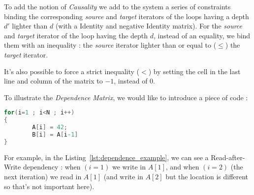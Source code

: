 \documentclass[paper=a4, fontsize=11.5pt]{scrartcl}
\numberwithin{equation}{section}        %
\numberwithin{figure}{section}          %
\numberwithin{table}{section}               %
\begin{document}
\begin{itemize}
                To add the notion of \textit{Causality} we add to the system a series of
                constraints binding the corresponding \textit{source} and \textit{target}
                iterators of the loops having a depth $d'$ lighter than $d$
                (with a Identity and negative Identity matrix).
                For the \textit{source} and \textit{target} iterator of the loop having
                the depth $d$, instead of an equality, we bind them with an inequality :
                the \textit{source} iterator lighter than or equal to ($\leq$) the \textit{target} iterator.

                It's also possible to force a strict inequality ($<$) by setting the cell
                in the last line and column of the matrix to $-1$, instead of $0$.
        \end{itemize}

        \medskip
        
        To illustrate the \textit{Dependence Matrix}, we would like to introduce a piece of code :
\begin{lstlisting}[frame=single, language=C, caption={Simple code for Dependence Relation example}, label={lst:dependence_example}]
for(i=1 ; i<N ; i++)
{
        A[i] = 42;
        B[i] = A[i-1]
}
\end{lstlisting}
        
        For example, in the Listing~\ref{lst:dependence_example}, we can see a Read-after-Write
        dependency : when $(i=1)$ we write in $A[1]$, and when $(i=2)$ (the next iteration)
        we read in $A[1]$ (and write in $A[2]$ but the location is different so that's not important here).
\end{document}
